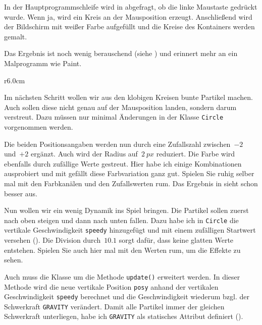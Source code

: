 In der Hauptprogrammschleife wird in  abgefragt, ob die linke Maustaste gedrückt wurde. Wenn ja, wird ein Kreis an der Mausposition erzeugt. Anschließend wird der Bildschirm mit weißer Farbe aufgefüllt und die Kreise des Kontainers werden gemalt.

Das Ergebnis ist noch wenig berauschend (siehe ) und erinnert mehr an ein Malprogramm wie Paint.


\begin{wrapfigure}[10]{r}{6.0cm}%
	\begin{center}%
		\vspace{-1cm}%
	\end{center}%
\end{wrapfigure}%
Im nächsten Schritt wollen wir aus den klobigen Kreisen bunte Partikel machen. Auch sollen diese nicht genau auf der Mausposition landen, sondern darum verstreut. Dazu müssen nur minimal Änderungen in der Klasse \texttt{Circle} vorgenommen werden.

Die beiden Positionsangaben werden nun durch eine Zufallszahl zwischen~$-2$ und~$+2$ ergänzt. Auch wird der Radius auf~$2~px$ reduziert. Die Farbe wird ebenfalls durch zufällige Werte gestreut. Hier habe ich einige Kombinationen ausprobiert und mit gefällt diese Farbvariation ganz gut. Spielen Sie ruhig selber mal mit den Farbkanälen und den Zufallswerten rum. Das Ergebnis in  sieht schon besser aus. 


Nun wollen wir ein wenig Dynamik ins Spiel bringen. Die Partikel sollen zuerst nach oben steigen und dann nach unten fallen. Dazu habe ich in \texttt{Circle} die vertikale Geschwindigkeit \texttt{speedy} hinzugefügt und mit einem zufälligen Startwert versehen (). Die Division durch~$10.1$ sorgt dafür, dass keine glatten Werte entstehen. Spielen Sie auch hier mal mit den Werten rum, um die Effekte zu sehen.

Auch muss die Klasse um die Methode \texttt{update()} erweitert werden. In dieser Methode wird die neue vertikale Position \texttt{posy} anhand der vertikalen Geschwindigkeit \texttt{speedy} berechnet und die Geschwindigkeit wiederum bzgl. der Schwerkraft \texttt{GRAVITY} verändert. Damit alle Partikel immer der gleichen Schwerkraft unterliegen, habe ich \texttt{GRAVITY} als statisches Attribut definiert ().

